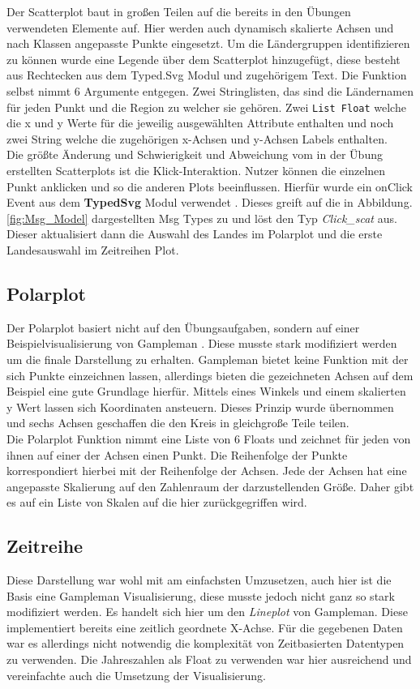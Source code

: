 Der Scatterplot baut in großen Teilen auf die bereits in den Übungen verwendeten Elemente auf. Hier werden auch dynamisch skalierte Achsen und nach Klassen angepasste Punkte eingesetzt. Um die Ländergruppen identifizieren zu können wurde eine Legende über dem Scatterplot hinzugefügt, diese besteht aus Rechtecken aus dem Typed.Svg Modul und zugehörigem Text. Die Funktion selbst nimmt 6 Argumente entgegen. Zwei Stringlisten, das sind die Ländernamen für jeden Punkt und die Region zu welcher sie gehören. Zwei \texttt{List Float} welche die x und y Werte für die jeweilig ausgewählten Attribute enthalten und noch zwei String welche die zugehörigen x-Achsen und y-Achsen Labels enthalten. \\

Die größte Änderung und Schwierigkeit und Abweichung vom in der Übung erstellten Scatterplots ist die Klick-Interaktion. Nutzer können die einzelnen Punkt anklicken und so die anderen Plots beeinflussen. Hierfür wurde ein onClick Event aus dem \textbf{TypedSvg} Modul verwendet \cite{typedsvg}. Dieses greift auf die in Abbildung.\ref{fig:Msg_Model} dargestellten Msg Types zu und löst den Typ \textit{Click\_scat} aus. 
Dieser aktualisiert dann die Auswahl des Landes im Polarplot und die erste Landesauswahl im Zeitreihen Plot. 

\subsection{Polarplot}

Der Polarplot basiert nicht auf den Übungsaufgaben, sondern auf einer Beispielvisualisierung von Gampleman \cite{polarplot}. Diese musste stark modifiziert werden um die finale Darstellung zu erhalten. Gampleman bietet keine Funktion mit der sich Punkte einzeichnen lassen, allerdings bieten die gezeichneten Achsen auf dem Beispiel eine gute Grundlage hierfür. Mittels eines Winkels und einem skalierten y Wert lassen sich Koordinaten ansteuern. Dieses Prinzip wurde übernommen und sechs Achsen geschaffen die den Kreis in gleichgroße Teile teilen. \\

Die Polarplot Funktion nimmt eine Liste von 6 Floats und zeichnet für jeden von ihnen auf einer der Achsen einen Punkt. Die Reihenfolge der Punkte korrespondiert hierbei mit der Reihenfolge der Achsen. Jede der Achsen hat eine angepasste Skalierung auf den Zahlenraum der darzustellenden Größe. Daher gibt es auf ein Liste von Skalen auf die hier zurückgegriffen wird. 

\subsection{Zeitreihe}

Diese Darstellung war wohl mit am einfachsten Umzusetzen, auch hier ist die Basis eine Gampleman Visualisierung, diese musste jedoch nicht ganz so stark modifiziert werden. Es handelt sich hier um den \textit{Lineplot} von Gampleman.\cite{linechart} Diese implementiert bereits eine zeitlich geordnete X-Achse. Für die gegebenen Daten war es allerdings nicht notwendig die komplexität von Zeitbasierten Datentypen zu verwenden. Die Jahreszahlen als Float zu verwenden war hier ausreichend und vereinfachte auch die Umsetzung der Visualisierung. 